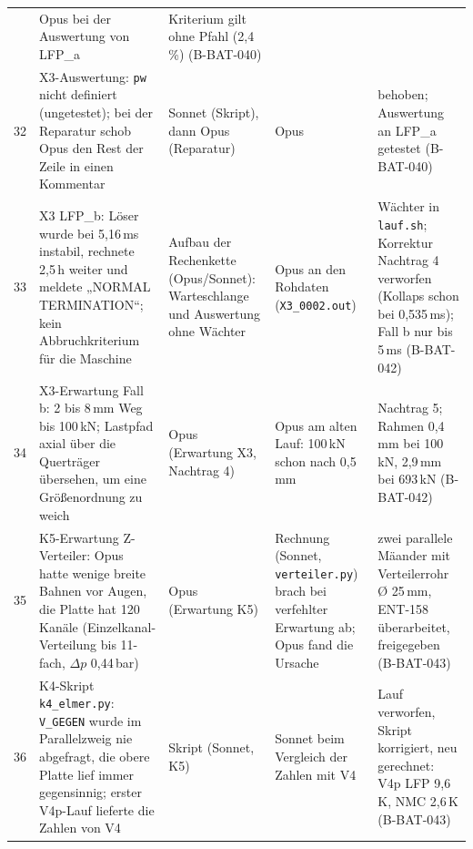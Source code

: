 \documentclass[10pt,a4paper]{article}
\begin{document}
\begin{longtable}{@{}p{0.4cm}p{3.6cm}p{2.5cm}p{4.4cm}p{3.0cm}@{}}
 & Opus bei der Auswertung von LFP\_a & Kriterium gilt ohne Pfahl (2,4\,\%) (B-BAT-040)\\
32 & X3-Auswertung: \texttt{pw} nicht definiert (ungetestet); bei der Reparatur schob Opus den Rest der Zeile in einen Kommentar & Sonnet (Skript), dann Opus (Reparatur)
 & Opus & behoben; Auswertung an LFP\_a getestet (B-BAT-040)\\
\midrule
33 & X3 LFP\_b: Löser wurde bei 5,16\,ms instabil, rechnete 2,5\,h weiter und meldete „NORMAL TERMINATION“; kein Abbruchkriterium für die Maschine & Aufbau der Rechenkette (Opus/Sonnet): Warteschlange und Auswertung ohne Wächter
 & Opus an den Rohdaten (\texttt{X3\_0002.out}) & Wächter in \texttt{lauf.sh}; Korrektur Nachtrag 4 verworfen (Kollaps schon bei 0,535\,ms); Fall b nur bis 5\,ms (B-BAT-042)\\
34 & X3-Erwartung Fall b: 2 bis 8\,mm Weg bis 100\,kN; Lastpfad axial über die Querträger übersehen, um eine Größenordnung zu weich & Opus (Erwartung X3, Nachtrag 4)
 & Opus am alten Lauf: 100\,kN schon nach 0,5\,mm & Nachtrag 5; Rahmen 0,4\,mm bei 100\,kN, 2,9\,mm bei 693\,kN (B-BAT-042)\\
35 & K5-Erwartung Z-Verteiler: Opus hatte wenige breite Bahnen vor Augen, die Platte hat 120 Kanäle (Einzelkanal-Verteilung bis 11-fach, $\Delta p$ 0,44\,bar) & Opus (Erwartung K5)
 & Rechnung (Sonnet, \texttt{verteiler.py}) brach bei verfehlter Erwartung ab; Opus fand die Ursache & zwei parallele Mäander mit Verteilerrohr Ø 25\,mm, ENT-158 überarbeitet, freigegeben (B-BAT-043)\\
36 & K4-Skript \texttt{k4\_elmer.py}: \texttt{V\_GEGEN} wurde im Parallelzweig nie abgefragt, die obere Platte lief immer gegensinnig; erster V4p-Lauf lieferte die Zahlen von V4 & Skript (Sonnet, K5)
 & Sonnet beim Vergleich der Zahlen mit V4 & Lauf verworfen, Skript korrigiert, neu gerechnet: V4p LFP 9,6\,K, NMC 2,6\,K (B-BAT-043)\\
\bottomrule
\end{longtable}
\end{document}
